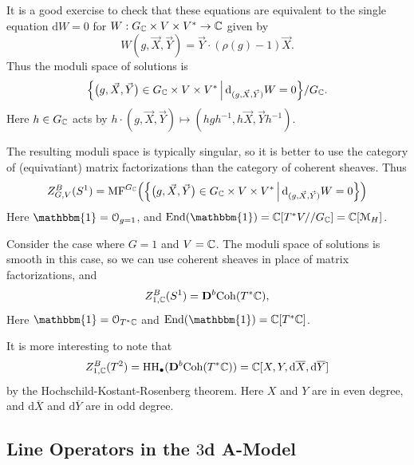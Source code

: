It is a good exercise to check that these equations are equivalent to the single equation $\mathrm{d} W = 0$ for $W: G_{\mathbb{C}} \times V \times V^* \to \mathbb{C}$ given by
\begin{equation}
W(g, \vec{X}, \vec{Y}) = \vec{Y} \cdot (\rho(g) - 1) \vec{X}.
\end{equation}
Thus the moduli space of solutions is
\begin{equation}
\Big\{ \big(g, \vec{X}, \vec{Y}\big) \in G_{\mathbb{C}} \times V \times V^* \, \Big| \, \mathrm{d}_{(g, \vec{X}, \vec{Y})} W = 0 \Big\} / G_{\mathbb{C}}.
\end{equation}
Here $h \in G_{\mathbb{C}}$ acts by $h \cdot (g, \vec{X}, \vec{Y}) \mapsto (h g h^{-1}, h \vec{X}, \vec{Y} h^{-1})$.

The resulting moduli space is typically singular, so it is better to use the category of (equivatiant) matrix factorizations than the category of coherent sheaves.
Thus
\begin{equation}
Z^B_{G,V}(S^1) = \mathrm{MF}^{G_{\mathbb{C}}}\Big(\Big\{ \big(g, \vec{X}, \vec{Y}\big) \in G_{\mathbb{C}} \times V \times V^* \, \Big| \, \mathrm{d}_{(g, \vec{X}, \vec{Y})} W = 0 \Big\}\Big)
\end{equation}
Here $\mathbbm{1} = \cO_{g=1}$, and $\mathrm{End}(\mathbbm{1}) = \C[T^* V // G_\C] = \C[\cM_H]$.

\begin{example}
Consider the case where $G = 1$ and $V = \mathbb{C}$.
The moduli space of solutions is smooth in this case, so we can use coherent sheaves in place of matrix factorizations, and
\begin{equation}
Z^B_{1,\mathbb{C}}(S^1) = {\mathbf{D}}^b \mathrm{Coh}(T^* \mathbb{C}),
\end{equation}
Here $\mathbbm{1} = \O_{T^* \C}$ and $\mathrm{End}(\mathbbm{1}) = \C[T^* \C]$.

It is more interesting to note that
\begin{equation}
Z^B_{1,\mathbb{C}}(T^2) = \mathrm{HH}_\bullet({\mathbf{D}}^b \mathrm{Coh}(T^* \mathbb{C})) = \mathbb{C}[X, Y, \mathrm{d}\overline{X}, \mathrm{d}\overline{Y}]
\end{equation}
by the Hochschild-Kostant-Rosenberg theorem.
Here $X$ and $Y$ are in even degree, and $\mathrm{d}\overline{X}$ and $\mathrm{d}\overline{Y}$ are in odd degree.
\end{example}

\subsection{Line Operators in the $3$d A-Model}

